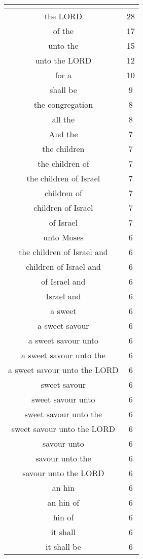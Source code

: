 \begin{center}
\begin{longtable}{|c|c|}
\hline \multicolumn{2}{c}{{ }} \\ \hline
\endfoot 
the LORD & 28\\ \hline 
of the & 17\\ \hline 
unto the & 15\\ \hline 
unto the LORD & 12\\ \hline 
for a & 10\\ \hline 
shall be & 9\\ \hline 
the congregation & 8\\ \hline 
all the & 8\\ \hline 
And the & 7\\ \hline 
the children & 7\\ \hline 
the children of & 7\\ \hline 
the children of Israel & 7\\ \hline 
children of & 7\\ \hline 
children of Israel & 7\\ \hline 
of Israel & 7\\ \hline 
unto Moses & 6\\ \hline 
the children of Israel and & 6\\ \hline 
children of Israel and & 6\\ \hline 
of Israel and & 6\\ \hline 
Israel and & 6\\ \hline 
a sweet & 6\\ \hline 
a sweet savour & 6\\ \hline 
a sweet savour unto & 6\\ \hline 
a sweet savour unto the & 6\\ \hline 
a sweet savour unto the LORD & 6\\ \hline 
sweet savour & 6\\ \hline 
sweet savour unto & 6\\ \hline 
sweet savour unto the & 6\\ \hline 
sweet savour unto the LORD & 6\\ \hline 
savour unto & 6\\ \hline 
savour unto the & 6\\ \hline 
savour unto the LORD & 6\\ \hline 
an hin & 6\\ \hline 
an hin of & 6\\ \hline 
hin of & 6\\ \hline 
it shall & 6\\ \hline 
it shall be & 6\\ \hline 

\end{longtable}
\end{center}
